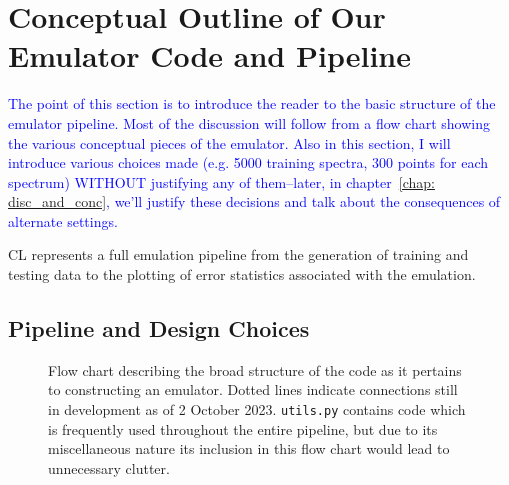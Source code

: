 \chapter{Conceptual Outline of Our Emulator Code and Pipeline}

\textcolor{blue}{The point of this section is to introduce the reader to the
basic structure of the emulator pipeline. Most of the discussion will follow
from a flow chart showing the various conceptual pieces of the emulator. Also
in this section, I will introduce various choices made (e.g. 5000 training
spectra, 300 points for each spectrum) WITHOUT justifying any of them--later,
in chapter~\ref{chap: disc_and_conc}, we'll justify these decisions and
talk about the consequences of alternate settings.}

CL represents a full emulation pipeline from the generation of training and 
testing data to the plotting of error statistics associated with
the emulation.


\section{Pipeline and Design Choices}




\begin{comment}

\SaveVerb{lhs}|lhs.py|
\SaveVerb{ged}|generate_emu_data.py|
\SaveVerb{ci}|camb_interface.py|
\SaveVerb{te}|train_emu.py|
\SaveVerb{ui}|user_interface.py|
\SaveVerb{utils}|utils.py|
\end{comment}

\begin{figure}[ht!]
    \centering
 	
 	\caption[CL Flow Chart]{Flow chart describing the broad structure of the
 		code as it pertains to constructing an emulator. Dotted lines
 		indicate connections still in development as of 2 October 2023.
 		\Verb|utils.py| contains code which is frequently used throughout
 		the entire pipeline, but due to its miscellaneous nature its
 		inclusion in this flow chart would lead to unnecessary clutter.}
 	\label{fig: flow_chart}
\end{figure}

